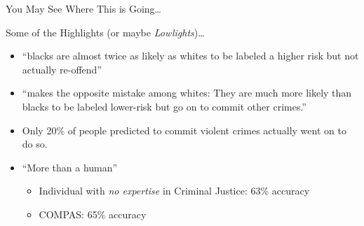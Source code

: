 \documentclass[11pt,dvipsnames,usenames,aspectratio=169]{beamer}  %
\begin{document}
\begin{frame}{You May See Where This is Going\ldots}
  \begin{center}
  \end{center}
\end{frame}

\begin{frame}{Some of the Highlights (or maybe \textit{Lowlights})\ldots}
  \noindent

  \begin{itemize}[<+->]
    \setlength{\itemsep}{12pt}
    \item ``blacks are almost twice as likely as whites to be labeled a higher risk but not actually re-offend''

    \item ``makes the opposite mistake among whites: They are much more likely than blacks to be labeled lower-risk but go on to commit other crimes.''

    \item Only 20\% of people predicted to commit violent crimes actually went on to do so.

    \item ``More  than a human''~\citep{Dressel:2018}
      \begin{itemize}[<+->]
        \item Individual with \textit{no expertise} in Criminal Justice: 63\% accuracy
        \item COMPAS: 65\% accuracy
      \end{itemize}
  \end{itemize}

\end{frame}
\end{document}

